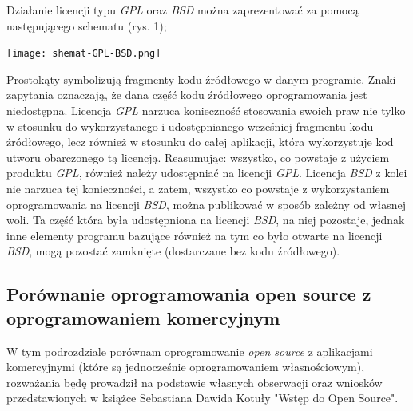 \documentclass{article}
\begin{document}
Działanie licencji typu \emph{GPL} oraz \emph{BSD} można zaprezentować za pomocą następującego schematu (rys. 1);
\begin{center}
        \texttt{[image: shemat-GPL-BSD.png]}
\end{center}
Prostokąty symbolizują fragmenty kodu źródłowego w danym programie. Znaki zapytania oznaczają, że dana część kodu źródłowego oprogramowania jest niedostępna. Licencja \emph{GPL} narzuca konieczność stosowania swoich praw nie tylko w stosunku do wykorzystanego i udostępnianego wcześniej fragmentu kodu źródłowego, lecz również w stosunku do całej aplikacji, która wykorzystuje kod utworu obarczonego tą licencją.
Reasumując: wszystko, co powstaje z użyciem produktu \emph{GPL}, również należy udostępniać na licencji \emph{GPL}. Licencja \emph{BSD} z kolei nie narzuca tej konieczności, a zatem, wszystko co powstaje z wykorzystaniem oprogramowania na licencji \emph{BSD}, można publikować w sposób zależny od własnej woli.
Ta część która była udostępniona na licencji \emph{BSD}, na niej pozostaje, jednak inne elementy programu bazujące również na tym co było otwarte na licencji \emph{BSD}, mogą pozostać zamknięte (dostarczane bez kodu źródłowego)\cite{Kotula}.

\subsection{Porównanie oprogramowania open source z oprogramowaniem komercyjnym}

\hspace{4mm} W tym podrozdziale porównam oprogramowanie \emph{open source} z aplikacjami komercyjnymi (które są jednocześnie oprogramowaniem własnościowym), rozważania będę prowadził na podstawie własnych obserwacji oraz wniosków przedstawionych w książce Sebastiana Dawida Kotuły "Wstęp do Open Source"\cite{Kotula}.
\end{document}
